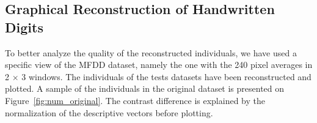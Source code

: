 \subsection{Graphical Reconstruction of Handwritten Digits}
\label{sec:num}

To better analyze the quality of the reconstructed individuals, we have used a specific view of the MFDD dataset, namely the one with the 240 pixel averages in 2 $\times$ 3 windows. The individuals of the tests datasets have been reconstructed and plotted. A sample of the individuals in the original dataset is presented on Figure~\ref{fig:num_original}. The contrast difference is explained by the normalization of the descriptive vectors before plotting.

\begin{figure}[h]
    \centering

\end{figure}
